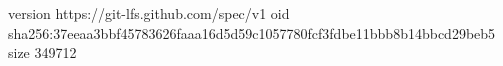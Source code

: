 version https://git-lfs.github.com/spec/v1
oid sha256:37eeaa3bbf45783626faaa16d5d59c1057780fcf3fdbe11bbb8b14bbcd29beb5
size 349712
